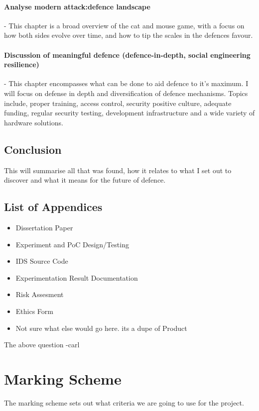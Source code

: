 \paragraph{Analyse modern attack:defence landscape} - This chapter is a broad overview of the cat and mouse game, with a focus on how both sides evolve over time, and how to tip the scales in the defences favour.

\paragraph{Discussion of meaningful defence (defence-in-depth, social engineering resilience)} - This chapter encompasses what can be done to aid defence to it's maximum. I will focus on defense in depth and diversification of defence mechanisms. 
Topics include, proper training, access control, security positive culture, adequate funding, regular security testing, development infrastructure and a wide variety of hardware solutions.

\subsection{Conclusion} This will summarise all that was found, how it relates to what I set out to discover and what it means for the future of defence. 

\subsection{List of Appendices}
\begin{itemize}
	\item Dissertation Paper
	\item Experiment and PoC Design/Testing
	\item IDS Source Code
	\item Experimentation Result Documentation
	\item Risk Assesment
	\item Ethics Form
	\item Not sure what else would go here. its a dupe of Product
\end{itemize}
\todo  The above question -carl 

\section{Marking Scheme}
The marking scheme sets out what criteria we are going to use for the project.

